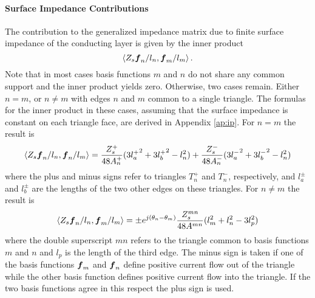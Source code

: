 \paragraph{Surface Impedance Contributions}
The contribution to the generalized impedance matrix due to finite
surface impedance of the conducting layer is given by the inner
product
\begin{equation}
  \left< Z_s \boldsymbol{f}_n/l_n,\boldsymbol{f}_m/l_m \right>.
\end{equation}
Note that in most cases basis functions $m$ and $n$ do not share any
common support and the inner product yields zero.  
Otherwise, two cases remain. Either
$n=m$, or $n \neq m$ with edges $n$ and $m$  common to a single
triangle. The formulas for the inner product in these cases, assuming that the 
surface impedance is constant on each triangle face,  
are derived in 
Appendix \ref{ap:ip}.  For $n=m$ the result is
\begin{equation}
\left< Z_s \boldsymbol{f}_n/l_n,\boldsymbol{f}_n/l_m \right> = \frac{Z_s^+}{48A_n^+}(3{l_a^+}^2 + 
                     3{l_b^+}^2 - l_n^2)
            + \frac{Z_s^-}{48A_n^-}(3{l_a^-}^2 + 3{l_b^-}^2 - l_n^2)
\end{equation}
where the plus and minus signs refer to triangles $T_n^+$ and $T_n^-$, 
respectively, and $l_a^{\pm}$ and $l_b^{\pm}$ are the lengths of the 
two other edges on these triangles.  For $n \neq m$ the result is
\begin{equation}
\left< Z_s \boldsymbol{f}_n/l_n,\boldsymbol{f}_m/l_m \right> = \pm
e^{j(\theta_n-\theta_m)}
\frac{Z_s^{mn}}{48A^{mn}}
                    (l_m^2 + l_n^2 - 3 l_{p}^2)
\end{equation}
where the double superscript $mn$ refers to the triangle common 
to basis functions $m$ and 
$n$ and $l_{p}$ is the length of the third edge.  The minus sign is taken if 
one of the basis functions $\boldsymbol{f}_m$ and $\boldsymbol{f}_n$ define positive current flow out 
of the triangle while the other basis function defines positive current flow 
into the triangle.  If the two basis functions agree in this respect the plus 
sign is used.
  
